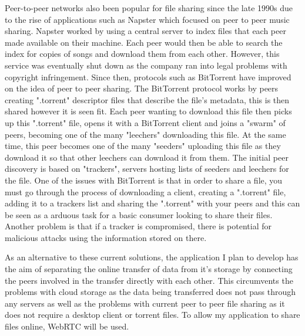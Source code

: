 \documentclass[]{report}
\begin{document}
			Peer-to-peer networks also been popular for file sharing since the late 1990s due to the rise of applications such as Napster which focused on peer to peer music sharing. Napster worked by using a central server to index files that each peer made available on their machine. Each peer would then be able to search the index for copies of songs and download them from each other. However, this service was eventually shut down as the company ran into legal problems with copyright infringement. Since then, protocols such as BitTorrent have improved on the idea of peer to peer sharing. The BitTorrent protocol works by peers creating ".torrent" descriptor files that describe the file's metadata, this is then shared however it is seen fit. Each peer wanting to download this file then picks up this ".torrent" file, opens it with a BitTorrent client and joins a "swarm" of peers, becoming one of the many "leechers" downloading this file. At the same time, this peer becomes one of the many "seeders" uploading this file as they download it so that other leechers can download it from them. The initial peer discovery is based on "trackers", servers hosting lists of seeders and leechers for the file. One of the issues with BitTorrent is that in order to share a file, you must go through the process of downloading a client, creating a ".torrent" file, adding it to a trackers list and sharing the ".torrent" with your peers and this can be seen as a arduous task for a basic consumer looking to share their files. Another problem is that if a tracker is compromised, there is potential for malicious attacks using the information stored on there.

			As an alternative to these current solutions, the application I plan to develop has the aim of separating the online transfer of data from it's storage by connecting the peers involved in the transfer directly with each other. This circumvents the problems with cloud storage as the data being transferred does not pass through any servers as well as the problems with current peer to peer file sharing as it does not require a desktop client or torrent files. To allow my application to share files online, WebRTC will be used.
			
\end{document}
